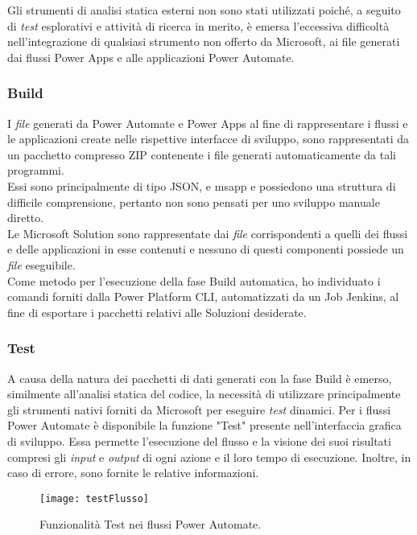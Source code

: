 \noindent Gli strumenti di analisi statica esterni non sono stati utilizzati poiché, a seguito di \emph{test} esplorativi e attività di ricerca in merito, è emersa l'eccessiva difficoltà nell'integrazione di qualsiasi strumento non offerto da Microsoft, ai file generati dai flussi Power Apps e alle applicazioni Power Automate. 

\subsubsection*{Build}
I \emph{file} generati da Power Automate e Power Apps al fine di rappresentare i flussi e le applicazioni create nelle rispettive interfacce di sviluppo, sono rappresentati da un pacchetto compresso ZIP contenente i file generati automaticamente da tali programmi.\\
Essi sono principalmente di tipo JSON, e msapp e possiedono una struttura di difficile comprensione, pertanto non sono pensati per uno sviluppo manuale diretto.\\
Le Microsoft Solution sono rappresentate dai \emph{file} corrispondenti a quelli dei flussi e delle applicazioni in esse contenuti e nessuno di questi componenti possiede un \emph{file} eseguibile.\\
Come metodo per l'esecuzione della fase Build automatica, ho individuato i comandi forniti dalla Power Platform CLI, automatizzati da un Job Jenkins, al fine di esportare i pacchetti relativi alle Soluzioni desiderate. 

\subsubsection*{Test}
A causa della natura dei pacchetti di dati generati con la fase Build è emerso, similmente all'analisi statica del codice, la necessità di utilizzare principalmente gli strumenti nativi forniti da Microsoft per eseguire \emph{test} dinamici. 
Per i flussi Power Automate è disponibile la funzione "Test" presente nell'interfaccia grafica di sviluppo. Essa permette l'esecuzione del flusso e la visione dei suoi risultati compresi gli \emph{input} e \emph{output} di ogni azione e il loro tempo di esecuzione. 
Inoltre, in caso di errore, sono fornite le relative informazioni. 
\begin{figure}[htbp] 
    \centering 
    \texttt{[image: testFlusso]} 
    \caption{Funzionalità Test nei flussi Power Automate.}
    \label{fig:testFlusso}
\end{figure}


